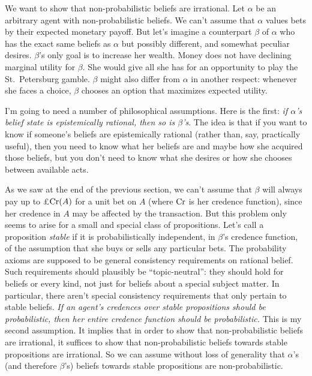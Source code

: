 We want to show that non-probabilistic beliefs are irrational. Let $\alpha$ be
an arbitrary agent with non-probabilistic beliefs. We can't assume that $\alpha$
values bets by their expected monetary payoff. But let's imagine a counterpart
$\beta$ of $\alpha$ who has the exact same beliefs as $\alpha$ but possibly
different, and somewhat peculiar desires. $\beta$'s only goal is to increase her
wealth. Money does not have declining marginal utility for $\beta$. She would
give all she has for an opportunity to play the St.\ Petersburg gamble. $\beta$
might also differ from $\alpha$ in another respect: whenever she faces a choice,
$\beta$ chooses an option that maximizes expected utility.

I'm going to need a number of philosophical assumptions. Here is the first:
\emph{if $\alpha$'s belief state is epistemically rational, then so is
  $\beta$'s}. The idea is that if you want to know if someone's beliefs are
epistemically rational (rather than, say, practically useful), then you need
to know what her beliefs are and maybe how she acquired those beliefs, but you
don't need to know what she desires or how she chooses between available acts.

As we saw at the end of the previous section, we can't assume that $\beta$ will
always pay up to £$\text{Cr}(A)$ for a unit bet on $A$ (where $\text{Cr}$ is her credence
function), since her credence in $A$ may be affected by the transaction. But
this problem only seems to arise for a small and special class of propositions.
Let's call a proposition \emph{stable} if it is probabilistically independent,
in $\beta$'s credence function, of the assumption that she buys or sells any
particular bets. The probability axioms are supposed to be general consistency
requirements on rational belief. Such requirements should plausibly be
``topic-neutral'': they should hold for beliefs or every kind, not just for
beliefs about a special subject matter. In particular, there aren't special
consistency requirements that only pertain to stable beliefs. \emph{If an
  agent's credences over stable propositions should be probabilistic, then her
  entire credence function should be probabilistic.} This is my second
assumption. It implies that in order to show that non-probabilistic beliefs are
irrational, it suffices to show that non-probabilistic beliefs towards stable
propositions are irrational. So we can assume without loss of generality that
$\alpha$'s (and therefore $\beta$'s) beliefs towards stable propositions are
non-probabilistic.

